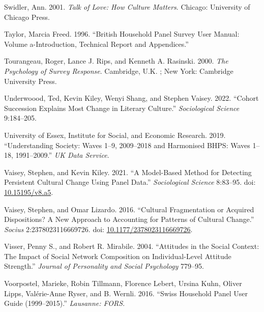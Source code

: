 \documentclass[
  12pt,
]{article}
\newlength{\cslhangindent}
\newlength{\cslentryspacingunit} %
\newenvironment{CSLReferences}[2] %
 {%
  \setlength{\parindent}{0pt}
  \ifodd #1
  \let\oldpar\par
  \def\par{\hangindent=\cslhangindent\oldpar}
  \fi
  \setlength{\parskip}{#2\cslentryspacingunit}
 }%
 {}
\begin{document}
\begin{CSLReferences}{1}{0}
\leavevmode{}%
Swidler, Ann. 2001. \emph{Talk of {Love}: {How} {Culture} {Matters}}.
Chicago: University of Chicago Press.

\leavevmode{}%
Taylor, Marcia Freed. 1996. {``British Household Panel Survey User
Manual: Volume a-Introduction, Technical Report and Appendices.''}

\leavevmode{}%
Tourangeau, Roger, Lance J. Rips, and Kenneth A. Rasinski. 2000.
\emph{The Psychology of Survey Response}. Cambridge, U.K. ; New York:
Cambridge University Press.

\leavevmode{}%
Underwoood, Ted, Kevin Kiley, Wenyi Shang, and Stephen Vaisey. 2022.
{``Cohort Succession Explains Most Change in Literary Culture.''}
\emph{Sociological Science} 9:184--205.

\leavevmode{}%
University of Essex, Institute for Social, and Economic Research. 2019.
{``Understanding Society: Waves 1--9, 2009--2018 and Harmonised BHPS:
Waves 1--18, 1991--2009.''} \emph{UK Data Service}.

\leavevmode{}%
Vaisey, Stephen, and Kevin Kiley. 2021. {``A {Model}-{Based} {Method}
for {Detecting} {Persistent} {Cultural} {Change} {Using} {Panel}
{Data}.''} \emph{Sociological Science} 8:83--95. doi:
\href{https://doi.org/10.15195/v8.a5}{10.15195/v8.a5}.

\leavevmode{}%
Vaisey, Stephen, and Omar Lizardo. 2016. {``Cultural {Fragmentation} or
{Acquired} {Dispositions}? {A} {New} {Approach} to {Accounting} for
{Patterns} of {Cultural} {Change}.''} \emph{Socius} 2:2378023116669726.
doi:
\href{https://doi.org/10.1177/2378023116669726}{10.1177/2378023116669726}.

\leavevmode{}%
Visser, Penny S., and Robert R. Mirabile. 2004. {``Attitudes in the
Social Context: {The} Impact of Social Network Composition on
Individual-Level Attitude Strength.''} \emph{Journal of Personality and
Social Psychology} 779--95.

\leavevmode{}%
Voorpostel, Marieke, Robin Tillmann, Florence Lebert, Ursina Kuhn,
Oliver Lipps, Valérie-Anne Ryser, and B. Wernli. 2016. {``Swiss
Household Panel User Guide (1999--2015).''} \emph{Lausanne: FORS}.


\end{CSLReferences}
\end{document}

